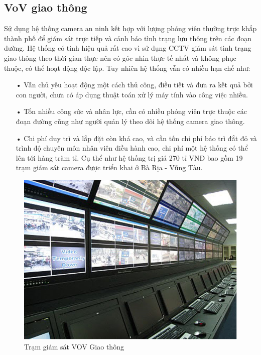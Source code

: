 \subsection{VoV giao thông}
Sử dụng hệ thống camera an ninh kết hợp với lượng phóng viên thường trực khắp thành phố để giám sát trực tiếp và cảnh báo tình trạng lưu thông trên các đoạn đường. Hệ thống có tính hiệu quả rất cao vì sử dụng CCTV giám sát tình trạng giao thông theo thời gian thực nên có góc nhìn thực tế nhất và không phục thuộc, có thể hoạt động độc lập. Tuy nhiên hệ thống vẫn có nhiều hạn chế như:
\begin{itemize}
\item[•]Vẫn chủ yếu hoạt động một cách thủ công, điều tiết và đưa ra kết quả bởi con người, chưa có áp dụng thuật toán xử lý máy tính vào công việc nhiều.
\item[•]Tốn nhiều công sức và nhân lực, cần có nhiều phóng viên trực thuộc các đoạn đường cũng như người quản lý theo dõi hệ thống camera giao thông.
\item[•]Chi phí duy trì và lắp đặt còn khá cao, và cần tốn chi phí bảo trì đắt đỏ và trình độ chuyên môn nhân viên điều hành cao, chi phí một hệ thống có thể lên tới hàng trăm tỉ. Cụ thể như hệ thống trị giá 270 tỉ VNĐ bao gồm 19 trạm giám sát camera được triển khai ở Bà Rịa - Vũng Tàu.
\end{itemize}
\begin{figure}[H] 
\centering    
\includegraphics[width=1.0\textwidth]{pic1}
\caption[Trạm giám sát VOV Giao thông ]{Trạm giám sát VOV Giao thông}
\label{fig:pic1}
\end{figure}



